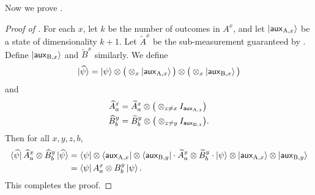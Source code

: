 Now we prove .
\begin{proof}[Proof of ]
For each $x$, let $k$ be the number of outcomes in $A^x$,
and let $\ket{\mathsf{aux}_{\mathrm{A},x}}$ be a state of dimensionality $k+1$.
Let $\widetilde{A}^x$ be the sub-measurement guaranteed by .
Define $\ket{\mathsf{aux}_{\mathrm{B},x}}$ and $\widetilde{B}^x$ similarly.
We define
\begin{equation*}
\ket{\widehat{\psi}} = \ket{\psi} \otimes \big(\otimes_{x} \ket{\mathsf{aux}_{\mathrm{A},x}}\big)
					\otimes \big(\otimes_{x} \ket{\mathsf{aux}_{\mathrm{B},x}}\big)
\end{equation*}
and
\begin{align*}
\widehat{A}^x_a
&= \widetilde{A}^x_a \otimes \big(\otimes_{z \neq x} I_{\mathsf{aux}_{\mathrm{A},z}}\big)\\
\widehat{B}^y_b
&= \widetilde{B}^y_b \otimes \big(\otimes_{z\neq y} I_{\mathsf{aux}_{\mathrm{B},z}}\big).
\end{align*}
Then for all $x,y,z,b$,
\begin{align*}
\bra{\widehat{\psi}} \widehat{A}^x_a \otimes \widehat{B}^y_b \ket{\widehat{\psi}}
& = \bra{\psi} \otimes \bra{\mathsf{aux}_{\mathrm{A},x}} \otimes \bra{\mathsf{aux}_{\mathrm{B},y}}
	\cdot \widetilde{A}^x_a \otimes \widetilde{B}^y_b \cdot \ket{\psi} \otimes \ket{\mathsf{aux}_{\mathrm{A},x}} \otimes \ket{\mathsf{aux}_{\mathrm{B},y}}\\
&= 	\bra{\psi} A^x_a \otimes B^y_b \ket{\psi}.
\end{align*}
This completes the proof.
\end{proof}

